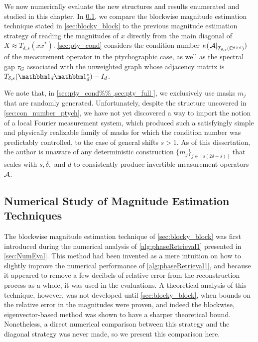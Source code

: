 We now numerically evaluate the new structures and results enumerated and studied in this chapter.  In \cref{sec:pn_blocky}, we compare the blockwise magnitude estimation technique stated in \cref{sec:blocky_block} to the previous magnitude estimation strategy of reading the magnitudes of $x$ directly from the main diagonal of $X \approx T_{\delta, s}(x x^*)$.  \cref{sec:pty_cond} considers the condition number $\kappa(\left.\mathcal{A}\right|_{T_{\delta, s}(\mathbb{C}^{d \times d})})$ of the measurement operator in the ptychographic case, as well as the spectral gap $\tau_G$ associated with the unweighted graph whose adjacency matrix is $T_{\delta, s}(\one_d \one_d^*) - I_d$.  %

We note that, in \cref{sec:pty_cond%
}, we exclusively use masks $m_j$ that are randomly generated.  Unfortunately, despite the structure uncovered in \cref{sec:con_number_ptych}, we have not yet discovered a way to import the notion of a local Fourier measurement system, which produced such a satisfyingly simple and physically realizable family of masks for which the condition number was predictably controlled, to the case of general shifts $s > 1$.  As of this dissertation, the author is unaware of any deterministic construction $\{m_j\}_{j \in [s(2 \delta - s)]}$ that scales with $s, \delta,$ and $d$ to consistently produce invertible measurement operators $\mathcal{A}$.

\subsection{Numerical Study of Magnitude Estimation Techniques}
\label{sec:pn_blocky}
The blockwise magnitude estimation technique of \cref{sec:blocky_block} was first introduced during the numerical analysis of \cref{alg:phaseRetrieval1} presented in \cref{sec:NumEval}.  This method had been invented as a mere intuition on how to slightly improve the numerical performance of \cref{alg:phaseRetrieval1}, and because it appeared to remove a few decibels of relative error from the reconstruction process as a whole, it was used in the evaluations.  A theoretical analysis of this technique, however, was not developed until \cref{sec:blocky_block}, when bounds on the relative error in the magnitudes were proven, and indeed the blockwise, eigenvector-based method was shown to have a sharper theoretical bound.  Nonetheless, a direct numerical comparison between this strategy and the diagonal strategy was never made, so we present this comparison here.

